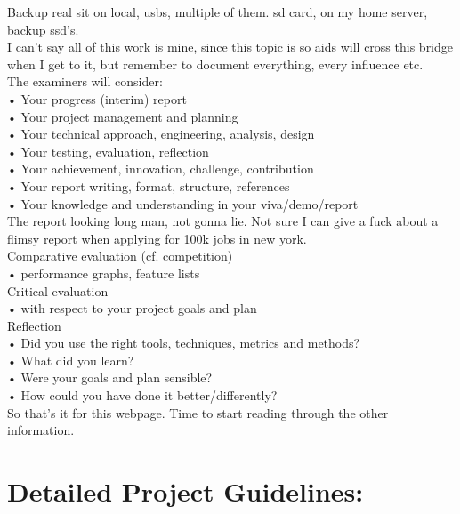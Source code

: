\documentclass [12pt]{article}
\begin{document}
Backup real sit on local, usbs, multiple of them. sd card, on my home server, backup ssd's.\\ 


I can't say all of this work is mine, since this topic is so aids will cross this bridge when I get to it, but remember to document everything, every influence etc. \\ 

The examiners will consider:\\
• Your progress (interim) report\\
• Your project management and planning\\
• Your technical approach, engineering, analysis, design\\
• Your testing, evaluation, reflection\\
• Your achievement, innovation, challenge, contribution\\
• Your report writing, format, structure, references\\
• Your knowledge and understanding in your viva/demo/report\\


The report looking long man, not gonna lie. Not sure I can give a fuck about a flimsy report when applying for 100k jobs in new york.\\ 


Comparative evaluation (cf. competition)\\
• performance graphs, feature lists\\

Critical evaluation\\
• with respect to your project goals and plan\\

Reflection\\
• Did you use the right tools, techniques, metrics and methods?\\
• What did you learn?\\
• Were your goals and plan sensible?\\
• How could you have done it better/differently?\\


So that's it for this webpage. Time to start reading through the other information.\\ 



\section{Detailed Project Guidelines:}
\end{document}
